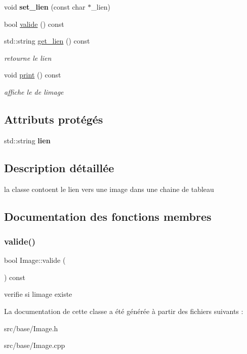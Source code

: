\begin{DoxyCompactItemize}
\mbox{\label{class_image_a5501a0b6ba5e7e23706211deb443fb50}} 
void {\bfseries set\+\_\+lien} (const char $\ast$\+\_\+lien)
\item 
bool \mbox{\hyperlink{class_image_a73850779b4e32fbe214f5c3fad620854}{valide}} () const
\item 
\mbox{\label{class_image_aba8f03a51b8b00ca960f20b6815e558f}} 
std\+::string \mbox{\hyperlink{class_image_aba8f03a51b8b00ca960f20b6815e558f}{get\+\_\+lien}} () const
\begin{DoxyCompactList}\small\item\em retourne le lien \end{DoxyCompactList}\item 
\mbox{\label{class_image_ae2379b7f0c93169809b3b0de1d3046fc}} 
void \mbox{\hyperlink{class_image_ae2379b7f0c93169809b3b0de1d3046fc}{print}} () const
\begin{DoxyCompactList}\small\item\em affiche le de l\textquotesingle{}image \end{DoxyCompactList}\end{DoxyCompactItemize}
\subsection*{Attributs protégés}
\begin{DoxyCompactItemize}
\item 
\mbox{\label{class_image_adb76bf3a51635a995a5bb24b81013b71}} 
std\+::string {\bfseries lien}
\end{DoxyCompactItemize}


\subsection{Description détaillée}
la classe contoent le lien vers une image dans une chaine de tableau 

\subsection{Documentation des fonctions membres}
\mbox{\label{class_image_a73850779b4e32fbe214f5c3fad620854}} 
\subsubsection{\texorpdfstring{valide()}{valide()}}
{\footnotesize\ttfamily bool Image\+::valide (\begin{DoxyParamCaption}{ }\end{DoxyParamCaption}) const}

verifie si l\textquotesingle{}image existe 

La documentation de cette classe a été générée à partir des fichiers suivants \+:\begin{DoxyCompactItemize}
\item 
src/base/Image.\+h\item 
src/base/Image.\+cpp\end{DoxyCompactItemize}

